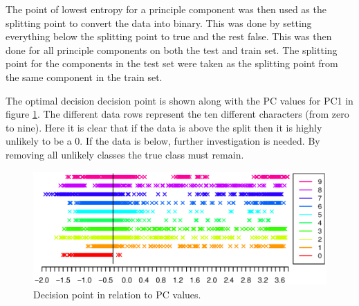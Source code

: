 The point of lowest entropy for a principle component was then used as the splitting point to convert the data into binary.
This was done by setting everything below the splitting point to true and the rest false.
This was then done for all principle components on both the test and train set. 
The splitting point for the components in the test set were taken as the splitting point from the same component in the train set.

The optimal decision decision point is shown along with the PC values for PC1 in figure \ref{fig:decision_point}. 
The different data rows represent the ten different characters (from zero to nine).
Here it is clear that if the data is above the split then it is highly unlikely to be a 0.
If the data is below, further investigation is needed.
By removing all unlikely classes the true class must remain.

\begin{figure}[H]
\includegraphics[width = \textwidth]{graphics/decision_seperation}
\caption{Decision point in relation to PC values.}
\label{fig:decision_point}
\end{figure}





